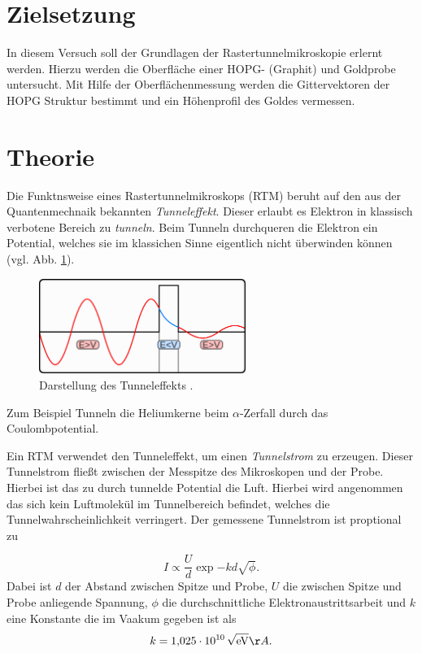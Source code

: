 \setcounter{page}{1}
\section*{Zielsetzung}
In diesem Versuch soll der Grundlagen der Rastertunnelmikroskopie
erlernt werden. Hierzu werden die Oberfläche einer HOPG- (Graphit) und
Goldprobe untersucht. Mit Hilfe der Oberflächenmessung werden die Gittervektoren
der HOPG Struktur bestimmt und ein Höhenprofil des Goldes vermessen.

\section{Theorie}
Die Funktnsweise eines  Rastertunnelmikroskops (RTM) beruht auf den aus der Quantenmechnaik bekannten
\emph{Tunneleffekt}. Dieser erlaubt es Elektron in klassisch verbotene Bereich zu \emph{tunneln}.
Beim Tunneln durchqueren die Elektron ein Potential, welches sie im klassichen Sinne
eigentlich nicht überwinden können (vgl. Abb. \ref{fig: tunneleffekt}).
\begin{figure}[h]
  \centering
  \includegraphics[width=0.6\textwidth]{./pics/tunelleffekt.png}
  \caption{Darstellung des Tunneleffekts \cite{tunnel}.}
  \label{fig: tunneleffekt}
\end{figure}
Zum Beispiel Tunneln die Heliumkerne beim $\alpha$-Zerfall durch das Coulombpotential.

Ein RTM verwendet den Tunneleffekt, um einen \emph{Tunnelstrom} zu erzeugen. Dieser Tunnelstrom
fließt zwischen der Messpitze des Mikroskopen und der Probe. Hierbei ist das zu durch tunnelde
Potential die Luft. Hierbei wird angenommen das sich kein Luftmolekül im Tunnelbereich befindet, welches
die Tunnelwahrscheinlichkeit verringert. Der gemessene Tunnelstrom ist proptional zu

\begin{equation}
  \label{eq: tunnelstrom}
I\propto \frac{U}{d}\exp{-kd\sqrt{\phi}}.
\end{equation}
Dabei ist $d$ der Abstand zwischen Spitze und Probe, $U$ die zwischen Spitze und Probe anliegende Spannung,
$\phi$ die durchschnittliche Elektronaustrittsarbeit und $k$ eine Konstante die im Vaakum gegeben ist als
\begin{equation*}
  k=\SI{1.025e10}{\per\sqrt{\eV}} \AA.
\end{equation*}

